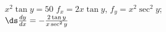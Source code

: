 {$x^2\tan y = 50$}
{$f_x = 2x\tan y$, $f_y = x^2\sec^2y$;\\
$\ds\frac{dy}{dx} = -\frac{2\tan y}{x\sec^2y}$
}

